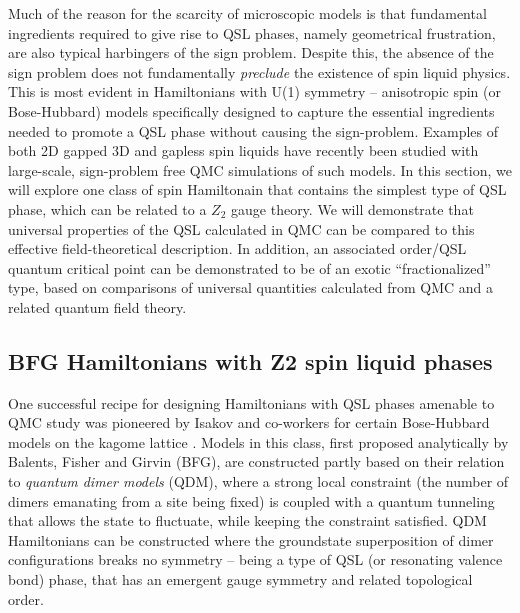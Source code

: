 \documentclass[range]{ar2e}
\begin{document}
Much of the reason for the scarcity of microscopic models is that fundamental ingredients required to give rise to QSL phases, namely geometrical frustration, are also typical harbingers of the sign problem.  Despite this, the absence of the sign problem does not fundamentally {\it preclude} the existence of spin liquid physics.  This is most evident in Hamiltonians with U(1) symmetry -- anisotropic spin (or Bose-Hubbard) models specifically designed to capture the essential ingredients needed to promote a QSL phase without causing the sign-problem.  
Examples of both 2D gapped \cite{Isakov1,Isakov2,Long,TopoEE} 3D and gapless \cite{Isakov3} spin liquids have recently been studied with large-scale, sign-problem free QMC simulations of such models.
In this section, we will explore one class of spin Hamiltonain that contains the simplest type of QSL phase, which can be related to a $Z_2$ gauge theory.  We will demonstrate that universal properties of the QSL calculated in QMC can be compared to this
effective field-theoretical description.  In addition, an associated order/QSL quantum critical point can be demonstrated to be of an exotic
``fractionalized'' type, based on comparisons of universal quantities calculated from QMC and a related quantum field theory.

\subsection{BFG Hamiltonians with Z2 spin liquid phases}


One successful recipe for designing Hamiltonians with QSL phases amenable to QMC study was pioneered by Isakov and co-workers for certain Bose-Hubbard models on the kagome lattice \cite{Isakov1, Isakov2, TopoEE}.  Models in this class, first proposed analytically by Balents, Fisher and Girvin \cite{BFG} (BFG),
are constructed partly based on their relation to {\it quantum dimer models} (QDM), where a strong local constraint (the number of dimers emanating from a site being fixed) is coupled with a quantum tunneling that allows the state to fluctuate, while keeping the constraint satisfied.  QDM Hamiltonians can be constructed where the groundstate superposition of dimer configurations breaks no symmetry -- being a type of QSL (or resonating valence bond) phase, that has an emergent gauge symmetry and related topological order.
\end{document}
